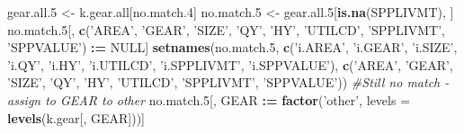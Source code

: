 \documentclass[]{article}
\newenvironment{Shaded}{\begin{snugshade}}{\end{snugshade}}
\newcommand{\KeywordTok}[1]{\textcolor[rgb]{0.13,0.29,0.53}{\textbf{#1}}}
\newcommand{\DataTypeTok}[1]{\textcolor[rgb]{0.13,0.29,0.53}{#1}}
\newcommand{\DecValTok}[1]{\textcolor[rgb]{0.00,0.00,0.81}{#1}}
\newcommand{\StringTok}[1]{\textcolor[rgb]{0.31,0.60,0.02}{#1}}
\newcommand{\CommentTok}[1]{\textcolor[rgb]{0.56,0.35,0.01}{\textit{#1}}}
\newcommand{\OtherTok}[1]{\textcolor[rgb]{0.56,0.35,0.01}{#1}}
\newcommand{\OperatorTok}[1]{\textcolor[rgb]{0.81,0.36,0.00}{\textbf{#1}}}
\newcommand{\ErrorTok}[1]{\textcolor[rgb]{0.64,0.00,0.00}{\textbf{#1}}}
\newcommand{\NormalTok}[1]{#1}
\begin{document}
\begin{Shaded}
\begin{Highlighting}[]
\NormalTok{  gear.all.}\DecValTok{5}\NormalTok{ <-}\StringTok{ }\NormalTok{k.gear.all[no.match.}\DecValTok{4}\NormalTok{]}
\NormalTok{  no.match.}\DecValTok{5}\NormalTok{ <-}\StringTok{ }\NormalTok{gear.all.}\DecValTok{5}\NormalTok{[}\KeywordTok{is.na}\NormalTok{(SPPLIVMT), ]}
\NormalTok{  no.match.}\DecValTok{5}\NormalTok{[, }\KeywordTok{c}\NormalTok{(}\StringTok{'AREA'}\NormalTok{, }\StringTok{'GEAR'}\NormalTok{, }\StringTok{'SIZE'}\NormalTok{, }\StringTok{'QY'}\NormalTok{, }\StringTok{'HY'}\NormalTok{, }\StringTok{'UTILCD'}\NormalTok{, }\StringTok{'SPPLIVMT'}\NormalTok{, }\StringTok{'SPPVALUE'}\NormalTok{) }\OperatorTok{:}\ErrorTok{=}\StringTok{ }\OtherTok{NULL}\NormalTok{]}
  \KeywordTok{setnames}\NormalTok{(no.match.}\DecValTok{5}\NormalTok{, }\KeywordTok{c}\NormalTok{(}\StringTok{'i.AREA'}\NormalTok{, }\StringTok{'i.GEAR'}\NormalTok{, }\StringTok{'i.SIZE'}\NormalTok{, }\StringTok{'i.QY'}\NormalTok{, }\StringTok{'i.HY'}\NormalTok{, }\StringTok{'i.UTILCD'}\NormalTok{,}
                         \StringTok{'i.SPPLIVMT'}\NormalTok{, }\StringTok{'i.SPPVALUE'}\NormalTok{), }
                       \KeywordTok{c}\NormalTok{(}\StringTok{'AREA'}\NormalTok{, }\StringTok{'GEAR'}\NormalTok{, }\StringTok{'SIZE'}\NormalTok{, }\StringTok{'QY'}\NormalTok{, }\StringTok{'HY'}\NormalTok{, }\StringTok{'UTILCD'}\NormalTok{, }\StringTok{'SPPLIVMT'}\NormalTok{, }\StringTok{'SPPVALUE'}\NormalTok{))}
  \CommentTok{#Still no match - assign to GEAR to other}
\NormalTok{  no.match.}\DecValTok{5}\NormalTok{[, GEAR }\OperatorTok{:}\ErrorTok{=}\StringTok{ }\KeywordTok{factor}\NormalTok{(}\StringTok{'other'}\NormalTok{, }\DataTypeTok{levels =} \KeywordTok{levels}\NormalTok{(k.gear[, GEAR]))]}
  

\end{Highlighting}
\end{Shaded}
\end{document}
